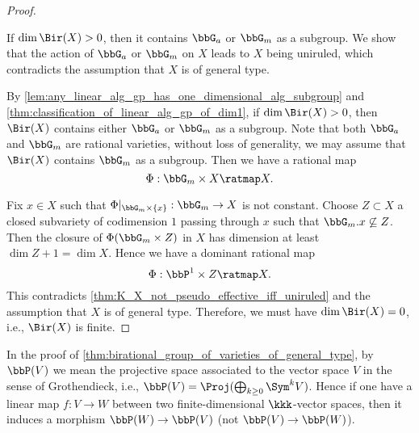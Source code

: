 \begin{proof}
        \begin{step}\label{step_in_thm:birational_group_of_varieties_of_general_type:Bir_X_is_finite}
            If \(\dim \Bir(X) > 0\), then it contains \(\bbG_a\) or \(\bbG_m\) as a subgroup.
            We show that the action of \(\bbG_a\) or \(\bbG_m\) on \(X\) leads to \(X\) being uniruled, which contradicts the assumption that \(X\) is of general type.
        \end{step}

        By \cref{lem:any_linear_alg_gp_has_one_dimensional_alg_subgroup} and \cref{thm:classification_of_linear_alg_gp_of_dim1}, if \(\dim \Bir(X) > 0\), then \(\Bir(X)\) contains either \(\bbG_a\) or \(\bbG_m\) as a subgroup.
        Note that both \(\bbG_a\) and \(\bbG_m\) are rational varieties, without loss of generality, we may assume that \(\Bir(X)\) contains \(\bbG_m\) as a subgroup.
        Then we have a rational map
        \[ \Phi: \bbG_m \times X \ratmap X. \]

        Fix \(x \in X\) such that \(\Phi|_{\bbG_m \times \{x\}}: \bbG_m \to X\) is not constant.
        Choose \(Z \subset X\) a closed subvariety of codimension \(1\) passing through \(x\) such that \(\bbG_m.x \not\subseteq Z\).
        Then the closure of \(\Phi(\bbG_m \times Z)\) in \(X\) has dimension at least \(\dim Z + 1 = \dim X\).
        Hence we have a dominant rational map
        \[ \Phi: \bbP^1 \times Z \ratmap X. \]
        This contradicts \cref{thm:K_X_not_pseudo_effective_iff_uniruled} and the assumption that \(X\) is of general type.
        Therefore, we must have \(\dim \Bir(X) = 0\), i.e., \(\Bir(X)\) is finite.
    \end{proof}

    \begin{remark}\label{rmk_on_finite_birational_group_of_general_type:projection_in_the_sense_of_Grothendieck_and_its_dual}
        In the proof of \cref{thm:birational_group_of_varieties_of_general_type}, by \(\bbP(V)\) we mean the projective space associated to the vector space \(V\) in the sense of Grothendieck, i.e., \(\bbP(V) = \Proj(\bigoplus_{k \geq 0} \Sym^k V)\).
        Hence if one have a linear map \(f: V \to W\) between two finite-dimensional \(\kkk\)-vector spaces, then it induces a morphism \(\bbP(W) \to \bbP(V)\) (not \(\bbP(V) \to \bbP(W)\)).
    \end{remark}

